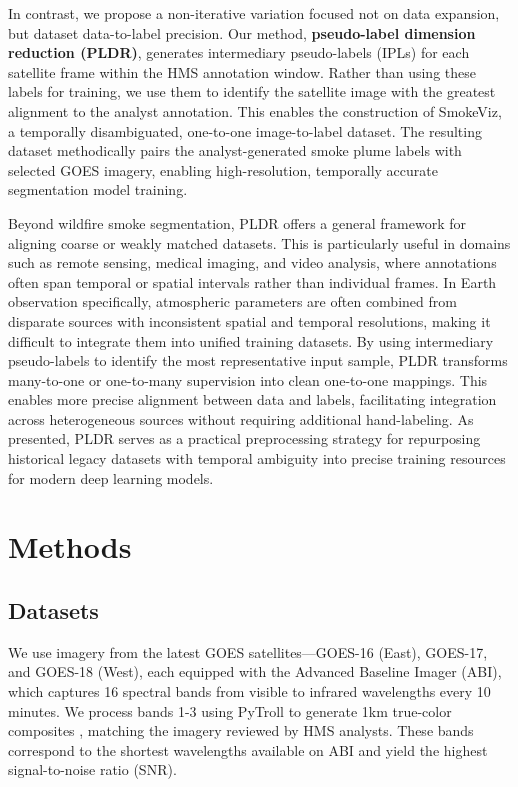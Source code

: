 \documentclass{article}
\begin{document}
In contrast, we propose a non-iterative variation focused not on data expansion, but dataset data-to-label precision. Our method, \textbf{pseudo-label dimension reduction (PLDR)}, generates intermediary pseudo-labels (IPLs) for each satellite frame within the HMS annotation window. Rather than using these labels for training, we use them to identify the satellite image with the greatest alignment to the analyst annotation. This enables the construction of SmokeViz, a temporally disambiguated, one-to-one image-to-label dataset. The resulting dataset methodically pairs the analyst-generated smoke plume labels with selected GOES imagery, enabling high-resolution, temporally accurate segmentation model training.


Beyond wildfire smoke segmentation, PLDR offers a general framework for aligning coarse or weakly matched datasets. This is particularly useful in domains such as remote sensing, medical imaging, and video analysis, where annotations often span temporal or spatial intervals rather than individual frames. In Earth observation specifically, atmospheric parameters are often combined from disparate sources with inconsistent spatial and temporal resolutions, making it difficult to integrate them into unified training datasets. By using intermediary pseudo-labels to identify the most representative input sample, PLDR transforms many-to-one or one-to-many supervision into clean one-to-one mappings. This enables more precise alignment between data and labels, facilitating integration across heterogeneous sources without requiring additional hand-labeling. As presented, PLDR serves as a practical preprocessing strategy for repurposing historical legacy datasets with temporal ambiguity into precise training resources for modern deep learning models.

\section{Methods}
\subsection{Datasets}

We use imagery from the latest GOES satellites—GOES-16 (East), GOES-17, and GOES-18 (West), each equipped with the Advanced Baseline Imager (ABI), which captures 16 spectral bands from visible to infrared wavelengths every 10 minutes. We process bands 1-3 using PyTroll \cite{satpy} to generate 1km true-color composites \cite{true_color}, matching the imagery reviewed by HMS analysts. These bands correspond to the shortest wavelengths available on ABI and yield the highest signal-to-noise ratio (SNR).
\end{document}
